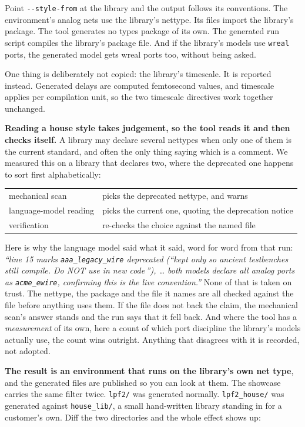 \documentclass[11pt,a4paper]{article}
\begin{document}
Point \texttt{-{}-style-from} at the library and the output follows
its conventions. The environment's analog nets use the library's
nettype. Its files import the library's package. The tool generates no
types package of its own. The generated run script compiles the
library's package file. And if the library's models use
\texttt{wreal} ports, the generated model gets wreal ports too,
without being asked.

One thing is deliberately not copied: the library's timescale. It is
reported instead. Generated delays are computed femtosecond values,
and timescale applies per compilation unit, so the two timescale
directives work together unchanged.

\textbf{Reading a house style takes judgement, so the tool reads it
and then checks itself.} A library may declare several nettypes when
only one of them is the current standard, and often the only thing
saying which is a comment. We measured this on a library that declares
two, where the deprecated one happens to sort first alphabetically:

\begin{center}
\begin{tabular}{@{}ll@{}}
\toprule
mechanical scan        & picks the deprecated nettype, and warns \\
language-model reading & picks the current one, quoting the deprecation notice \\
verification           & re-checks the choice against the named file \\
\bottomrule
\end{tabular}
\end{center}

\noindent Here is why the language model said what it said, word for
word from that run: \emph{``line 15 marks
\texttt{aaa{}\_legacy{}\_wire} deprecated (``kept only so ancient
testbenches still compile. Do NOT use in new code\,''), \ldots{} both
models declare all analog ports as \texttt{acme{}\_ewire}, confirming
this is the live convention.''} None of that is taken on trust. The
nettype, the package and the file it names are all checked against the
file before anything uses them. If the file does not back the claim,
the mechanical scan's answer stands and the run says that it fell
back. And where the tool has a \emph{measurement} of its own, here a
count of which port discipline the library's models actually use, the
count wins outright. Anything that disagrees with it is recorded, not
adopted.

\textbf{The result is an environment that runs on the library's own
net type}, and the generated files are published so you can look at
them. The showcase carries the same filter twice. \texttt{lpf2/} was
generated normally. \texttt{lpf2{}\_house/} was generated against
\texttt{house{}\_lib/}, a small hand-written library standing in for a
customer's own. Diff the two directories and the whole effect shows
up:
\end{document}

